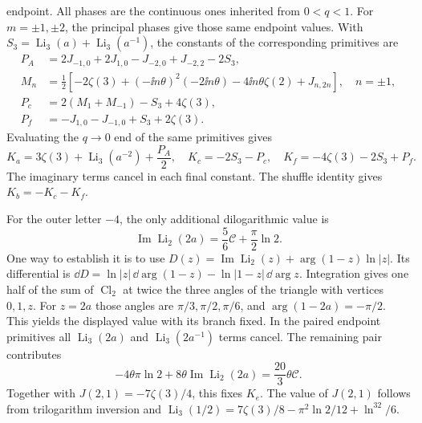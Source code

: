 endpoint. All phases are the continuous ones inherited from $0<q<1$.
For $m=\pm1,\pm2$, the principal phases give those same endpoint
values. With $S_3=\operatorname{Li}_3(a)+\operatorname{Li}_3(a^{-1})$,
the constants of the corresponding primitives are
\begin{align}
 P_A&=2J_{-1,0}+2J_{1,0}-J_{-2,0}+J_{-2,2}-2S_3,\\
 M_n&=\frac12\left[-2\zeta(3)+(-\ii n\theta)^2(-2\ii n\theta)
                  -4\ii n\theta\zeta(2)+J_{n,2n}\right],\quad n=\pm1,\\
 P_c&=2(M_1+M_{-1})-S_3+4\zeta(3),\\
 P_f&=-J_{1,0}-J_{-1,0}+S_3+2\zeta(3).
\end{align}
Evaluating the $q\to0$ end of the same primitives gives
\begin{equation}
 K_a=3\zeta(3)+\operatorname{Li}_3(a^{-2})+\frac{P_A}{2},\quad
 K_c=-2S_3-P_c,\quad K_f=-4\zeta(3)-2S_3+P_f.
\end{equation}
The imaginary terms cancel in each final constant. The shuffle
identity gives $K_b=-K_c-K_f$.

For the outer letter $-4$, the only additional dilogarithmic value is
\begin{equation}
 \operatorname{Im}\operatorname{Li}_2(2a)
          =\frac56\mathcal C+\frac\pi2\ln2.
\end{equation}
One way to establish it is to use
$D(z)=\operatorname{Im}\operatorname{Li}_2(z)+\arg(1-z)\ln|z|$.
Its differential is
$\dd D=\ln|z|\,\dd\arg(1-z)-\ln|1-z|\,\dd\arg z$.
Integration gives one half of the sum of $\operatorname{Cl}_2$ at
twice the three angles of the triangle with vertices $0,1,z$.
For $z=2a$ those angles are $\pi/3,\pi/2,\pi/6$, and
$\arg(1-2a)=-\pi/2$. This yields the displayed value with its
branch fixed. In the paired endpoint primitives all
$\operatorname{Li}_3(2a)$ and $\operatorname{Li}_3(2a^{-1})$ terms
cancel. The remaining pair contributes
\begin{equation}
 -4\theta\pi\ln2+8\theta\operatorname{Im}\operatorname{Li}_2(2a)
     =\frac{20}{3}\theta\mathcal C.
\end{equation}
Together with $J(2,1)=-7\zeta(3)/4$, this fixes $K_e$.
The value of $J(2,1)$ follows from trilogarithm inversion and
$\operatorname{Li}_3(1/2)=7\zeta(3)/8-\pi^2\ln2/12+\ln^32/6$.

